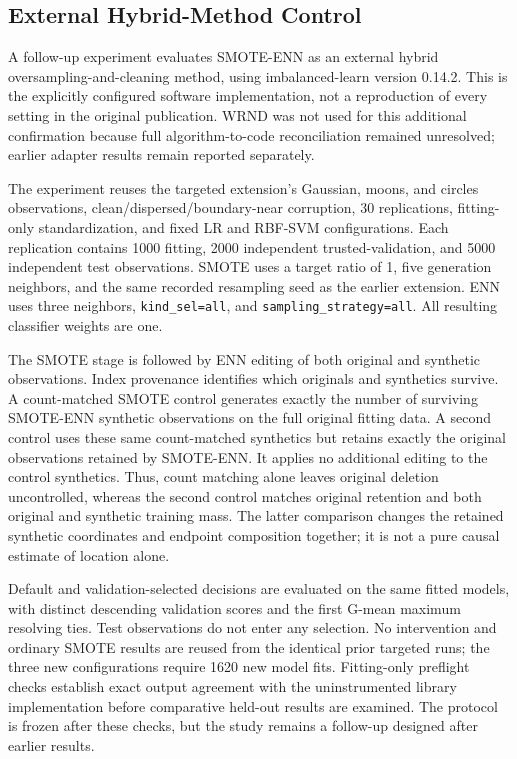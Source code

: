 \subsection{External Hybrid-Method Control}
\label{subsec:external_method_protocol}
A follow-up experiment evaluates SMOTE-ENN as an external hybrid oversampling-and-cleaning method\cite{batista2004balancing}, using imbalanced-learn version 0.14.2\cite{lemaitre2017imblearn}. This is the explicitly configured software implementation, not a reproduction of every setting in the original publication. WRND was not used for this additional confirmation because full algorithm-to-code reconciliation remained unresolved; earlier adapter results remain reported separately.

The experiment reuses the targeted extension's Gaussian, moons, and circles observations, clean/dispersed/boundary-near corruption, 30 replications, fitting-only standardization, and fixed LR and RBF-SVM configurations. Each replication contains 1000 fitting, 2000 independent trusted-validation, and 5000 independent test observations. SMOTE uses a target ratio of 1, five generation neighbors, and the same recorded resampling seed as the earlier extension. ENN uses three neighbors, \texttt{kind\_sel=all}, and \texttt{sampling\_strategy=all}. All resulting classifier weights are one.

The SMOTE stage is followed by ENN editing of both original and synthetic observations. Index provenance identifies which originals and synthetics survive. A count-matched SMOTE control generates exactly the number of surviving SMOTE-ENN synthetic observations on the full original fitting data. A second control uses these same count-matched synthetics but retains exactly the original observations retained by SMOTE-ENN. It applies no additional editing to the control synthetics. Thus, count matching alone leaves original deletion uncontrolled, whereas the second control matches original retention and both original and synthetic training mass. The latter comparison changes the retained synthetic coordinates and endpoint composition together; it is not a pure causal estimate of location alone.

Default and validation-selected decisions are evaluated on the same fitted models, with distinct descending validation scores and the first G-mean maximum resolving ties. Test observations do not enter any selection. No intervention and ordinary SMOTE results are reused from the identical prior targeted runs; the three new configurations require 1620 new model fits. Fitting-only preflight checks establish exact output agreement with the uninstrumented library implementation before comparative held-out results are examined. The protocol is frozen after these checks, but the study remains a follow-up designed after earlier results.


